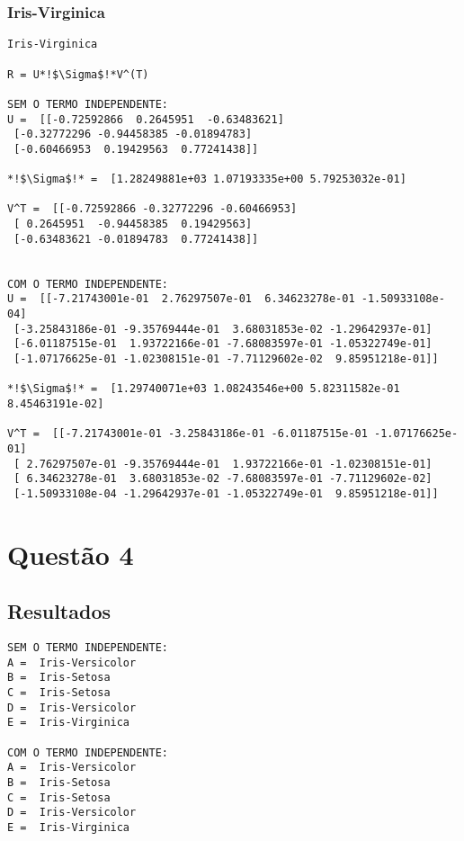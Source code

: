 \documentclass[a4paper,12pt,twoside]{article}
\begin{document}
\subsubsection{Iris-Virginica}
\begin{lstlisting}
Iris-Virginica

R = U*!$\Sigma$!*V^(T)

SEM O TERMO INDEPENDENTE: 
U =  [[-0.72592866  0.2645951  -0.63483621]
 [-0.32772296 -0.94458385 -0.01894783]
 [-0.60466953  0.19429563  0.77241438]]

*!$\Sigma$!* =  [1.28249881e+03 1.07193335e+00 5.79253032e-01]

V^T =  [[-0.72592866 -0.32772296 -0.60466953]
 [ 0.2645951  -0.94458385  0.19429563]
 [-0.63483621 -0.01894783  0.77241438]]


COM O TERMO INDEPENDENTE: 
U =  [[-7.21743001e-01  2.76297507e-01  6.34623278e-01 -1.50933108e-04]
 [-3.25843186e-01 -9.35769444e-01  3.68031853e-02 -1.29642937e-01]
 [-6.01187515e-01  1.93722166e-01 -7.68083597e-01 -1.05322749e-01]
 [-1.07176625e-01 -1.02308151e-01 -7.71129602e-02  9.85951218e-01]]

*!$\Sigma$!* =  [1.29740071e+03 1.08243546e+00 5.82311582e-01 8.45463191e-02]

V^T =  [[-7.21743001e-01 -3.25843186e-01 -6.01187515e-01 -1.07176625e-01]
 [ 2.76297507e-01 -9.35769444e-01  1.93722166e-01 -1.02308151e-01]
 [ 6.34623278e-01  3.68031853e-02 -7.68083597e-01 -7.71129602e-02]
 [-1.50933108e-04 -1.29642937e-01 -1.05322749e-01  9.85951218e-01]]
\end{lstlisting}

\section{Questão 4}
\subsection{Resultados}
\begin{lstlisting}
SEM O TERMO INDEPENDENTE: 
A =  Iris-Versicolor
B =  Iris-Setosa
C =  Iris-Setosa
D =  Iris-Versicolor
E =  Iris-Virginica

COM O TERMO INDEPENDENTE: 
A =  Iris-Versicolor
B =  Iris-Setosa
C =  Iris-Setosa
D =  Iris-Versicolor
E =  Iris-Virginica
\end{lstlisting}
\end{document}
